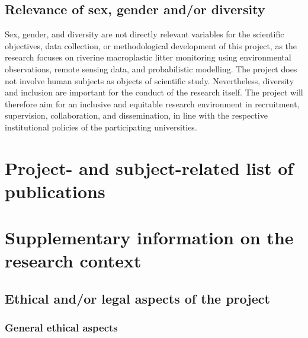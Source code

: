 \documentclass{scrartcl}
\begin{document}
\subsection{Relevance of sex, gender and/or diversity}

Sex, gender, and diversity are not directly relevant variables for the scientific objectives, data collection, or methodological development of this project, as the research focuses on riverine macroplastic litter monitoring using environmental observations, remote sensing data, and probabilistic modelling. The project does not involve human subjects as objects of scientific study. Nevertheless, diversity and inclusion are important for the conduct of the research itself. The project will therefore aim for an inclusive and equitable research environment in recruitment, supervision, collaboration, and dissemination, in line with the respective institutional policies of the participating universities.

\section{Project- and subject-related list of publications}
\label{sec:bib}

{\small
\renewcommand{\refname}{}
\vspace{-3em}
\setlength{\bibsep}{0pt}


}
%
%

\backmatter
\section{Supplementary information on the research context}

\subsection{Ethical and/or legal aspects of the project}

\subsubsection{General ethical aspects}
\end{document}
